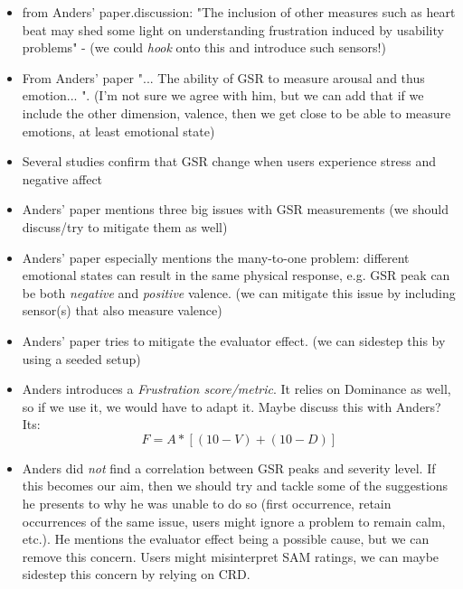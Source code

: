 \begin{itemize}
    \item from Anders' paper.discussion: "The inclusion of other measures such as heart
        beat may shed some light on understanding frustration induced by
        usability problems" - (we could \textit{hook} onto this and introduce such
        sensors!)
    \item From Anders' paper "... The ability of GSR to measure arousal and thus emotion... ". (I'm not sure we agree with him, but we can add that if we include the other dimension, valence, then we get close to be able to measure emotions, at least emotional state)
    \item Several studies confirm that GSR change when users experience stress and negative affect
    \item Anders' paper mentions three big issues with GSR measurements (we should discuss/try to mitigate them as well)
    \item Anders' paper especially mentions the many-to-one problem: different
        emotional states can result in the same physical response, e.g. GSR
        peak can be both \textit{negative} and \textit{positive} valence. (we
        can mitigate this issue by including sensor(s) that also measure
        valence)
    \item Anders' paper tries to mitigate the evaluator effect. (we can sidestep this by using a seeded setup)
    \item Anders introduces a \textit{Frustration score/metric}. It relies on Dominance as well, so if we use it, we would have to adapt it. Maybe discuss this with Anders? Its: \[F = A * [(10-V) + (10-D)]\]

    \item Anders did \textit{not} find a correlation between GSR peaks and
        severity level. If this becomes our aim, then we should try and tackle
        some of the suggestions he presents to why he was unable to do so
        (first occurrence, retain occurrences of the same issue, users might
        ignore a problem to remain calm, etc.). He mentions the evaluator
        effect being a possible cause, but we can remove this concern. Users
        might misinterpret SAM ratings, we can maybe sidestep this concern by
        relying on CRD.
\end{itemize}

